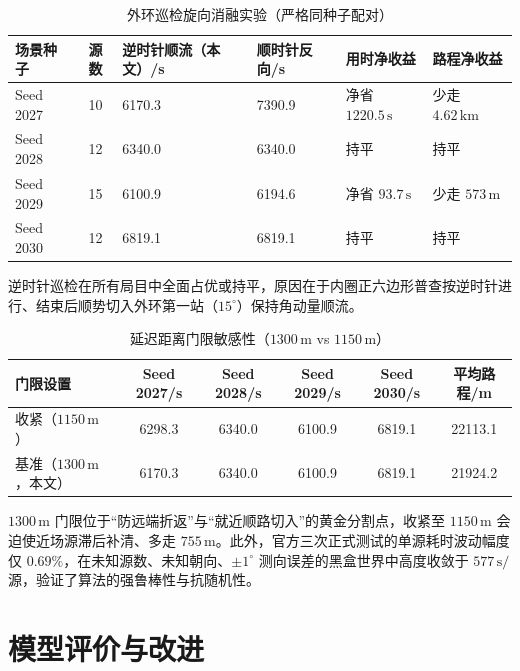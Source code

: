 \documentclass[12pt,a4paper]{article}
\begin{document}
\begin{table}[H]
\centering
\caption{外环巡检旋向消融实验（严格同种子配对）}
\small
\begin{tabularx}{\textwidth}{@{}L{2.0cm}cL{2.5cm}L{2.3cm}L{2.3cm}Y@{}}
\toprule
\textbf{场景种子} & \textbf{源数} & \textbf{逆时针顺流（本文）/s} & \textbf{顺时针反向/s} & \textbf{用时净收益} & \textbf{路程净收益} \\
\midrule
Seed 2027 & 10 & 6170.3 & 7390.9 & 净省 $1220.5\,\mathrm{s}$ & 少走 $4.62\,\mathrm{km}$ \\
Seed 2028 & 12 & 6340.0 & 6340.0 & 持平 & 持平 \\
Seed 2029 & 15 & 6100.9 & 6194.6 & 净省 $93.7\,\mathrm{s}$ & 少走 $573\,\mathrm{m}$ \\
Seed 2030 & 12 & 6819.1 & 6819.1 & 持平 & 持平 \\
\bottomrule
\end{tabularx}
\end{table}

逆时针巡检在所有局目中全面占优或持平，原因在于内圈正六边形普查按逆时针进行、结束后顺势切入外环第一站（$15^{\circ}$）保持角动量顺流。

\begin{table}[H]
\centering
\caption{延迟距离门限敏感性（$1300\,\mathrm{m}$ vs $1150\,\mathrm{m}$）}
\small
\begin{tabularx}{\textwidth}{@{}Yccccc@{}}
\toprule
\textbf{门限设置} & \textbf{Seed 2027/s} & \textbf{Seed 2028/s} & \textbf{Seed 2029/s} & \textbf{Seed 2030/s} & \textbf{平均路程/m} \\
\midrule
收紧（$1150\,\mathrm{m}$） & 6298.3 & 6340.0 & 6100.9 & 6819.1 & 22113.1 \\
基准（$1300\,\mathrm{m}$，本文） & 6170.3 & 6340.0 & 6100.9 & 6819.1 & 21924.2 \\
\bottomrule
\end{tabularx}
\end{table}

$1300\,\mathrm{m}$ 门限位于“防远端折返”与“就近顺路切入”的黄金分割点，收紧至 $1150\,\mathrm{m}$ 会迫使近场源滞后补清、多走 $755\,\mathrm{m}$。此外，官方三次正式测试的单源耗时波动幅度仅 $0.69\%$，在未知源数、未知朝向、$\pm 1^{\circ}$ 测向误差的黑盒世界中高度收敛于 $577\,\mathrm{s}/$源，验证了算法的强鲁棒性与抗随机性。

\section{模型评价与改进}
\end{document}
